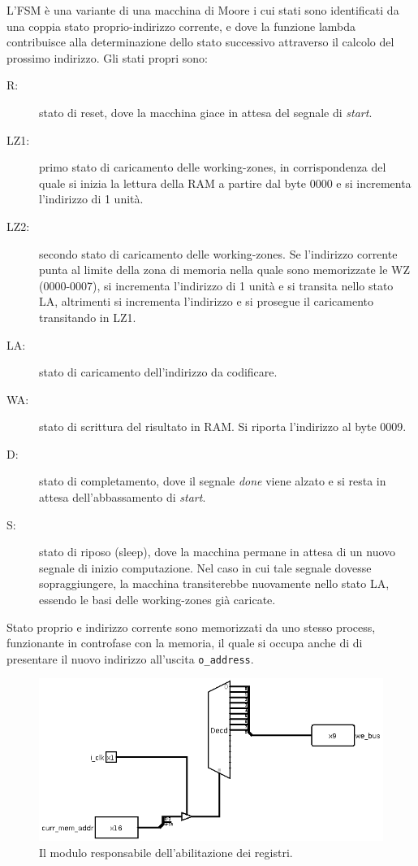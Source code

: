 \documentclass[11pt,a4paper]{article}
\begin{document}
L'FSM è una variante di una macchina di Moore i cui stati sono identificati da una coppia stato proprio-indirizzo corrente, e dove la funzione lambda
contribuisce alla determinazione dello stato successivo attraverso il calcolo del prossimo indirizzo. Gli stati propri sono:
\begin{description}
    \item[R:] stato di reset, dove la macchina giace in attesa del segnale di \emph{start}.
    \item[LZ1:] primo stato di caricamento delle working-zones, in corrispondenza del quale si inizia la lettura della RAM a partire dal byte 0000 e si
        incrementa l'indirizzo di 1 unità.
    \item[LZ2:] secondo stato di caricamento delle working-zones. Se l'indirizzo corrente punta al limite della zona di memoria nella quale sono
        memorizzate le WZ (0000-0007), si incrementa l'indirizzo di 1 unità e si transita nello stato LA, altrimenti si incrementa l'indirizzo e si
        prosegue il caricamento transitando in LZ1.
    \item[LA:] stato di caricamento dell'indirizzo da codificare.
    \item[WA:] stato di scrittura del risultato in RAM. Si riporta l'indirizzo al byte 0009.
    \item[D:] stato di completamento, dove il segnale \emph{done} viene alzato e si resta in attesa dell'abbassamento di \emph{start}.
    \item[S:] stato di riposo (sleep), dove la macchina permane in attesa di un nuovo segnale di inizio computazione. Nel caso in cui tale segnale dovesse
        sopraggiungere, la macchina transiterebbe nuovamente nello stato LA, essendo le basi delle working-zones già caricate.
\end {description}
Stato proprio e indirizzo corrente sono memorizzati da uno stesso process, funzionante in controfase con la memoria, il quale si occupa anche di di
presentare il nuovo indirizzo all'uscita \lstinline{o_address}.

\begin{figure}[ht]
    \includegraphics[scale=0.5]{reg_enabler.png}
    \caption[Gestore registri]{Il modulo responsabile dell'abilitazione dei registri.\label{reg_enabler}}
\end{figure}
\end{document}
